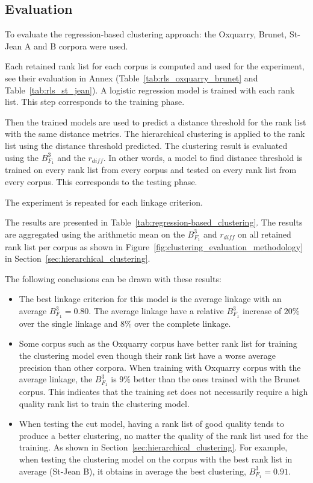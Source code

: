 \subsection{Evaluation}

To evaluate the regression-based clustering approach: the Oxquarry, Brunet, St-Jean A and B corpora were used.

Each retained rank list for each corpus is computed and used for the experiment, see their evaluation in Annex (Table~\ref{tab:rls_oxquarry_brunet} and Table~\ref{tab:rls_st_jean}).
A logistic regression model is trained with each rank list.
This step corresponds to the training phase.

Then the trained models are used to predict a distance threshold for the rank list with the same distance metrics.
The hierarchical clustering is applied to the rank list using the distance threshold predicted.
The clustering result is evaluated using the $B^3_{F_1}$ and the $r_{diff}$.
In other words, a model to find distance threshold is trained on every rank list from every corpus and tested on every rank list from every corpus.
This corresponds to the testing phase.

The experiment is repeated for each linkage criterion.

The results are presented in Table~\ref{tab:regression-based_clustering}.
The results are aggregated using the arithmetic mean on the $B^3_{F_1}$ and $r_{diff}$ on all retained rank list per corpus as shown in Figure~\ref{fig:clustering_evaluation_methodology} in Section~\ref{sec:hierarchical_clustering}.

The following conclusions can be drawn with these results:
\begin{itemize}
  \item
  The best linkage criterion for this model is the average linkage with an average $B^3_{F_1} = 0.80$.
  The average linkage have a relative $B^3_{F_1}$ increase of $20\%$ over the single linkage and $8\%$ over the complete linkage.
  \item
  Some corpus such as the Oxquarry corpus have better rank list for training the clustering model even though their rank list have a worse average precision than other corpora.
  When training with Oxquarry corpus with the average linkage, the $B^3_{F_1}$ is $9\%$ better than the ones trained with the Brunet corpus.
  This indicates that the training set does not necessarily require a high quality rank list to train the clustering model.
  \item
  When testing the cut model, having a rank list of good quality tends to produce a better clustering, no matter the quality of the rank list used for the training.
  As shown in Section~\ref{sec:hierarchical_clustering}.
  For example, when testing the clustering model on the corpus with the best rank list in average (St-Jean B), it obtains in average the best clustering, $B^3_{F_1} = 0.91$.
\end{itemize}

